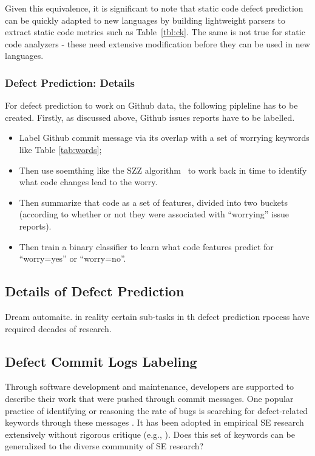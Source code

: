 \documentclass[10pt,conference]{IEEEtran}
\newcommand{\bi}{\begin{itemize}[leftmargin=0.4cm]}
\newcommand{\ei}{\end{itemize}}
\newcommand{\tbl}[1]{Table~\ref{tbl:#1}}
\begin{document}
Given this equivalence, it is significant to
note that static code defect prediction can be quickly adapted to new languages by building lightweight parsers to extract static code metrics such as \tbl{ck}. The same is not true for static code analyzers - these need extensive modification before they can be used in new languages.

\subsubsection{Defect Prediction: Details}

For defect prediction to work on Github data, the following pipleline has to be created.
Firstly, as discussed above, Github issues reports have to be labelled. 
  \bi
  \item
  Label Github commit message via its
  overlap  with a set of worrying  keywords like  Table \ref{tab:words};
  \item Then use soemthing like the SZZ algorithm~\cite{costa17szz, Kim08changes, Sliwerski05changes} to work back in time to  identify what code changes lead to the worry.
  \item Then summarize that code  as a set of features, divided into two buckets (according to whether or not they were associated with  ``worrying'' issue reports). 
  \item Then train a binary classifier  to learn what code features predict for ``worry=yes'' or ``worry=no''.
  \ei
  
\subsection{Details of Defect Prediction}

Dream automaitc. in reality certain sub-tasks in th defect prediction rpocess have 
required decades of research.


\subsection{Defect Commit Logs Labeling}

Through software development and maintenance, developers are supported to describe their work that were pushed through commit messages. One popular practice of identifying or reasoning the rate of bugs is searching for defect-related keywords through these messages \cite{mockus00changeskeys, hindle08_largecommits}. It has been adopted in empirical SE research extensively without rigorous critique (e.g., \cite{nayrolles18_clever, catolino17_jitmobile, kamei12_jit, Kim08changes}). Does this set of keywords can be generalized to the diverse community of SE research? 
\end{document}
